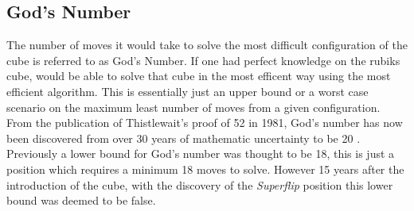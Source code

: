 \documentclass{article}
\begin{document}
\subsection{God's Number}
The number of moves it would take to solve the most difficult configuration of the cube is referred to as God's Number. If one had perfect knowledge on the rubiks cube, would be able to solve that cube in the most efficent way using the most efficient algorithm. This is essentially just an upper bound or a worst case scenario on the maximum least number of moves from a given configuration. From the publication of Thistlewait's proof of 52 in 1981, God's number has now been discovered from over 30 years of mathematic uncertainty to be 20 \cite{God}. \newline Previously a lower bound for God's number was thought to be 18, this is just a position which requires a minimum 18 moves to solve. However 15 years after the introduction of the cube, with the discovery of the \textit{Superflip} position this lower bound was deemed to be false.
\end{document}
